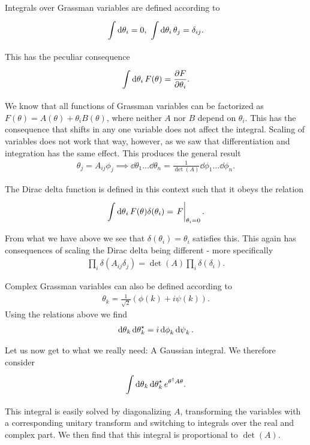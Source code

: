 Integrals over Grassman variables are defined according to
\begin{align*}
\int\limits_{}^{}\dd{\theta_{i}} = 0,\ \int\limits_{}^{}\dd{\theta_{i}}\theta_{j} = \delta_{ij}.
\end{align*}
This has the peculiar consequence
\begin{align*}
\int\limits_{}^{}\dd{\theta_{i}}F(\theta) = \pdv{F}{\theta_{i}}.
\end{align*}
We know that all functions of Grassman variables can be factorized as $F(\theta) = A(\theta) + \theta_{i}B(\theta)$, where neither $A$ nor $B$ depend on $\theta_{i}$. This has the consequence that shifts in any one variable does not affect the integral. Scaling of variables does not work that way, however, as we saw that differentiation and integration has the same effect. This produces the general result
\begin{align*}
\theta_{j} = A_{ij}\phi_{j}\implies \dd{\theta}_{1}\dots\dd{\theta}_{n} = \frac{1}{\det(A)}\dd{\phi}_{1}\dots\dd{\phi}_{n}.
\end{align*}

The Dirac delta function is defined in this context such that it obeys the relation
\begin{align*}
\inte{}{}\dd{\theta}_{i}F(\theta)\delta(\theta_{i}) = \eval{F}_{\theta_{i} = 0}.
\end{align*}
From what we have above we see that $\delta(\theta_{i}) = \theta_{i}$ satisfies this. This again has consequences of scaling the Dirac delta being different - more specifically
\begin{align*}
\prod\limits_{i}\delta(A_{ij}\delta_{j}) = \det(A)\prod\limits_{i}\delta(\delta_{i}).
\end{align*}

Complex Grassman variables can also be defined according to
\begin{align*}
	\theta_{k} = \frac{1}{\sqrt{2}}(\phi(k) + i\psi(k)).
\end{align*}
Using the relations above we find
\begin{align*}
	\dd{\theta}_{k}\dd{\theta}_{k}^{\star} = i\dd{\phi}_{k}\dd{\psi}_{k}.
\end{align*}

Let us now get to what we really need: A Gaussian integral. We therefore consider
\begin{align*}
	\int\limits_{}^{}\dd{\theta}_{k}\dd{\theta}_{k}^{\star} e^{\theta^{\dagger} A\theta}.
\end{align*}
This integral is easily solved by diagonalizing $A$, transforming the variables with a corresponding unitary transform and switching to integrals over the real and complex part. We then find that this integral is proportional to $\det(A)$.